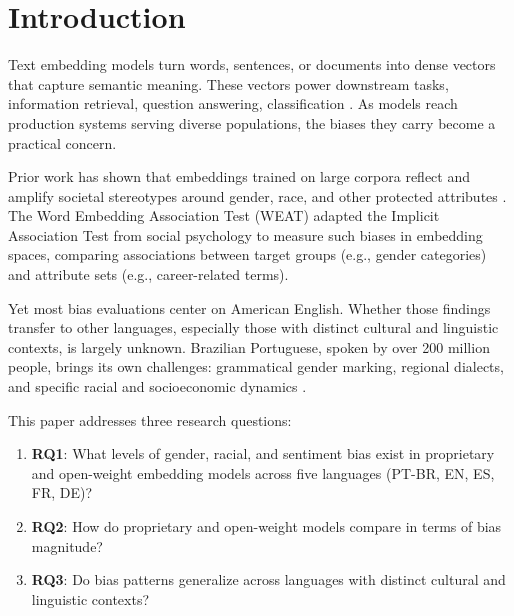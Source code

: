 \documentclass{sbc2019}
\begin{document}
\section{Introduction}

Text embedding models turn words, sentences, or documents into dense vectors that capture semantic meaning. These vectors power downstream tasks, information retrieval, question answering, classification \cite{mikolov2013word, pennington2014glove, devlin2019bert}. As models reach production systems serving diverse populations, the biases they carry become a practical concern.

Prior work has shown that embeddings trained on large corpora reflect and amplify societal stereotypes around gender, race, and other protected attributes \cite{bolukbasi2016man, caliskan2017semantics, garg2018word}. The Word Embedding Association Test (WEAT) \cite{caliskan2017semantics} adapted the Implicit Association Test from social psychology to measure such biases in embedding spaces, comparing associations between target groups (e.g., gender categories) and attribute sets (e.g., career-related terms).

Yet most bias evaluations center on American English. Whether those findings transfer to other languages, especially those with distinct cultural and linguistic contexts, is largely unknown. Brazilian Portuguese, spoken by over 200 million people, brings its own challenges: grammatical gender marking, regional dialects, and specific racial and socioeconomic dynamics \cite{taso2023sexismo}.

This paper addresses three research questions:
\begin{enumerate}[nosep]
    \item \textbf{RQ1}: What levels of gender, racial, and sentiment bias exist in proprietary and open-weight embedding models across five languages (PT-BR, EN, ES, FR, DE)?
    \item \textbf{RQ2}: How do proprietary and open-weight models compare in terms of bias magnitude?
    \item \textbf{RQ3}: Do bias patterns generalize across languages with distinct cultural and linguistic contexts?
\end{enumerate}
\end{document}
